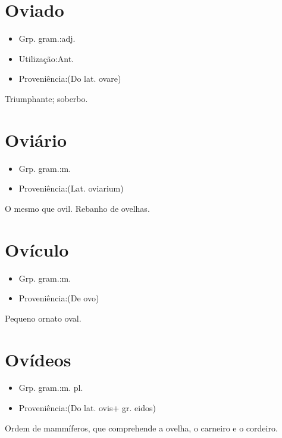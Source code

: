 \section{Oviado}
\begin{itemize}
\item {Grp. gram.:adj.}
\end{itemize}
\begin{itemize}
\item {Utilização:Ant.}
\end{itemize}
\begin{itemize}
\item {Proveniência:(Do lat. \textunderscore ovare\textunderscore )}
\end{itemize}
Triumphante; soberbo.
\section{Oviário}
\begin{itemize}
\item {Grp. gram.:m.}
\end{itemize}
\begin{itemize}
\item {Proveniência:(Lat. \textunderscore oviarium\textunderscore )}
\end{itemize}
O mesmo que \textunderscore ovil\textunderscore .
Rebanho de ovelhas.
\section{Ovículo}
\begin{itemize}
\item {Grp. gram.:m.}
\end{itemize}
\begin{itemize}
\item {Proveniência:(De \textunderscore ovo\textunderscore )}
\end{itemize}
Pequeno ornato oval.
\section{Ovídeos}
\begin{itemize}
\item {Grp. gram.:m. pl.}
\end{itemize}
\begin{itemize}
\item {Proveniência:(Do lat. \textunderscore ovis\textunderscore  + gr. \textunderscore eidos\textunderscore )}
\end{itemize}
Ordem de mammíferos, que comprehende a ovelha, o carneiro e o cordeiro.
